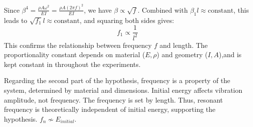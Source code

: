 \documentclass[a4paper,12pt]{article}
\begin{document}
    Since $\beta^4 = \frac{\rho A \omega^2}{EI} = \frac{\rho A (2\pi f)^2}{EI}$, we have $\beta \propto \sqrt{f}$. Combined with $\beta_1 l \approx \text{constant}$, this leads to $\sqrt{f_1} l \approx \text{constant}$, and squaring both sides gives:
    \begin{equation}\label{eqn:frequency_length_inverse_square_short}
    f_1 \propto \frac{1}{l^2}
    \end{equation}
    This confirms the relationship between frequency $f$ and length. The proportionality constant depends on material ($E, \rho$) and geometry ($I, A$),and is kept constant in throughout the experiments.

    Regarding the second part of the hypothesis, frequency is a property of the system, determined by material and dimensions. Initial energy affects vibration amplitude, not frequency. The frequency is set by length. Thus, resonant frequency is theoretically independent of initial energy, supporting the hypothesis. $f_{n}\not\sim E_{initial}$. \autocite{EngMechanics}
\end{document}
